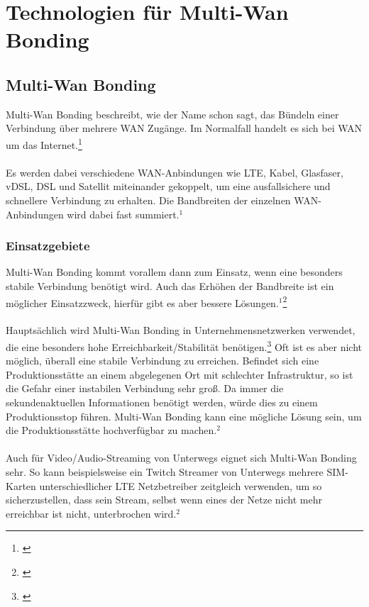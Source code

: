 \chapter{Technologien für Multi-Wan Bonding}
\label{chap:verwendeteTechnologien}
\section{Multi-Wan Bonding}
Multi-Wan Bonding beschreibt, wie der Name schon sagt, das Bündeln einer Verbindung über mehrere WAN Zugänge. Im Normalfall handelt es sich bei WAN um das Internet.\footnote[1]{\cite[Vgl.][]{MWAN}}
\\\\
Es werden dabei verschiedene WAN-Anbindungen wie LTE, Kabel, Glasfaser, vDSL, DSL und Satellit miteinander gekoppelt, um eine ausfallsichere und schnellere Verbindung zu erhalten. Die Bandbreiten der einzelnen WAN-Anbindungen wird dabei fast summiert.$^{1}$ 

\subsection{Einsatzgebiete}
Multi-Wan Bonding kommt vorallem dann zum Einsatz, wenn eine besonders stabile Verbindung benötigt wird. Auch das Erhöhen der Bandbreite ist ein möglicher Einsatzzweck, hierfür gibt es aber bessere Lösungen.$^{1}$\footnote[2]{\cite[Vgl.][]{MWAN1}}
\\\\
Hauptsächlich wird Multi-Wan Bonding in Unternehmensnetzwerken verwendet, die eine besonders hohe Erreichbarkeit/Stabilität benötigen.\footnote[3]{\cite[Vgl.][]{MWAN2}} Oft ist es aber nicht möglich, überall eine stabile Verbindung zu erreichen. Befindet sich eine Produktionsstätte an einem abgelegenen Ort mit schlechter Infrastruktur, so ist die Gefahr einer instabilen Verbindung sehr groß. Da immer die sekundenaktuellen Informationen benötigt werden, würde dies zu einem Produktionsstop führen. Multi-Wan Bonding kann eine mögliche Lösung sein, um die Produktionsstätte hochverfügbar zu machen.$^{2}$
\\\\
Auch für Video/Audio-Streaming von Unterwegs eignet sich Multi-Wan Bonding sehr. So kann beispielsweise ein Twitch Streamer von Unterwegs mehrere SIM-Karten unterschiedlicher LTE Netzbetreiber zeitgleich verwenden, um so sicherzustellen, dass sein Stream, selbst wenn eines der Netze nicht mehr erreichbar ist nicht, unterbrochen wird.$^{2}$

